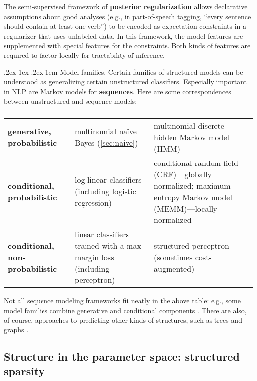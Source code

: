 \documentclass[11pt,letterpaper]{article}
\makeatletter
\renewcommand{\paragraph}{%
  \@startsection{paragraph}{4}%
  {\z@}{.2ex \@plus 1ex \@minus .2ex}{-1em}%
  {\normalfont\normalsize\bfseries}%
}
\makeatother
\begin{document}
The semi-supervised framework of \textbf{posterior regularization} \citep{ganchev-10} 
allows declarative assumptions about good analyses (e.g., in part-of-speech tagging, ``every sentence should contain at least one verb'') 
to be encoded as expectation constraints in a regularizer that uses unlabeled data.
In this framework, the model features are supplemented with special features for the constraints.
Both kinds of features are required to factor locally for tractability of inference.


\paragraph{Model families.} 
Certain families of structured models can be understood as generalizing certain unstructured classifiers.
Especially important in NLP are Markov models for \textbf{sequences}. 
Here are some correspondences between unstructured and sequence models:
%
\begin{center}\small
\begin{tabular}{@{}>{\raggedright\bf}p{9em}>{\raggedright}p{13em}@{~~}>{\raggedright\arraybackslash}p{16em}@{}}
& \multicolumn{1}{c}{Unstructured} & \multicolumn{1}{c}{Sequence} \\
\hline
generative, probabilistic & multinomial na\"{i}ve Bayes (\cref{sec:naive}) & {\raggedright multinomial discrete hidden Markov model (HMM)} \\
\hline
conditional, probabilistic & log-linear classifiers (including logistic regression) & conditional random field (CRF)---globally normalized; 
maximum entropy Markov model (MEMM)---locally normalized \\
\hline
conditional, non-probabilistic & linear classifiers trained with a max-margin loss (including perceptron) & structured perceptron \citep{collins-02} (sometimes cost-augmented) \\
\hline
\end{tabular}
\end{center}
%
Not all sequence modeling frameworks fit neatly in the above table: e.g., some model families combine 
generative and conditional components \citep{berg-kirkpatrick-10,ammar-14}.
There are also, of course, approaches to predicting other kinds of structures, 
such as trees \citep[in syntactic parsing: e.g.,][]{charniak-05,mcdonald-05} 
and graphs \citep[in semantic parsing: e.g.,][]{flanigan-14}.

\subsection{Structure in the parameter space: structured sparsity}
\end{document}
